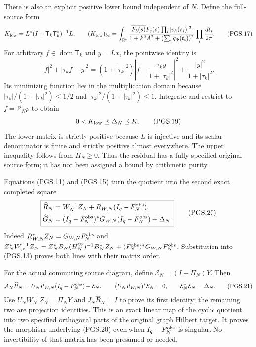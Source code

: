 There is also an explicit positive lower bound independent of \(N\).
Define the full-source form
\[
 K_{\rm low}=L^*(I+\mathsf T_k\mathsf T_k^*)^{-1}L,\qquad
 (K_{\rm low})_{bc}=\int_{\mathbb R^k}
   \frac{\overline{F_b(s)}F_c(s)
          \prod_i|v_h(s_i)|^2}
        {1+k^2A^2+(\sum_iq_\Phi(t_i))^2}
                  \prod_i\frac{dt_i}{2\pi}.
\tag{PGS.17}\label{eq:pgs-residual-bound}
\]
For arbitrary \(f\in\operatorname{dom}\mathsf T_k\) and \(y=Lx\),
the pointwise identity is
\[
 |f|^2+|\tau_k f-y|^2
  =(1+|\tau_k|^2)
       \left|f-\frac{\overline{\tau_k}y}{1+|\tau_k|^2}\right|^2
          +\frac{|y|^2}{1+|\tau_k|^2}.
\tag{PGS.18}\label{eq:pgs-pointwise-square}
\]
Its minimizing function lies in the multiplication domain because
\(|\tau_k|/(1+|\tau_k|^2)\le1/2\) and
\(|\tau_k|^2/(1+|\tau_k|^2)\le1\). Integrate and restrict to
\(f=\mathcal V_Np\) to obtain
\[
 0<K_{\rm low}\preceq\Delta_N\preceq K.
\tag{PGS.19}\label{eq:pgs-uniform-N}
\]
The lower matrix is strictly positive because \(L\) is injective
and its scalar denominator is finite and strictly positive almost
everywhere. The upper inequality follows from \(\Pi_N\ge0\).
Thus the residual has a fully specified original source form; it
has not been assigned a bound by arithmetic purity.

Equations (PGS.11) and (PGS.15) turn the quotient into the second
exact completed square
\[
\boxed{\begin{aligned}
 \widehat R_N&=W_N^{-1}Z_N+
                   R_{W,N}(I_q-F_N^{\rm obs}),\\
 \widehat G_N&=(I_q-F_N^{\rm obs})^*G_{W,N}
                   (I_q-F_N^{\rm obs})+\Delta_N.
\end{aligned}}
\tag{PGS.20}\label{eq:pgs-quotient-square}
\]
Indeed \(R_{W,N}^*Z_N=G_{W,N}F_N^{\rm obs}\) and
\(Z_N^*W_N^{-1}Z_N=Z_N^*B_N(H_N^W)^{-1}B_N^*Z_N
 +(F_N^{\rm obs})^*G_{W,N}F_N^{\rm obs}\).
Substitution into (PGS.13) proves both lines with their matrix order.

For the actual commuting source diagram, define
\(\mathcal E_N=(I-\Pi_N)Y\). Then
\[
 \mathcal A_N\widehat R_N
       =U_NR_{W,N}(I_q-F_N^{\rm obs})-\mathcal E_N,\qquad
 (U_NR_{W,N})^*\mathcal E_N=0,\qquad
 \mathcal E_N^*\mathcal E_N=\Delta_N.
\tag{PGS.21}\label{eq:pgs-orthogonal-source-map}
\]
Use \(U_NW_N^{-1}Z_N=\Pi_NY\) and \(J_N\widehat R_N=I\)
to prove its first identity; the remaining two are projection
identities. This is an exact linear map of the cyclic quotient into
two specified orthogonal parts of the original graph Hilbert target.
It proves the morphism underlying (PGS.20) even when
\(I_q-F_N^{\rm obs}\) is singular. No invertibility of that matrix
has been presumed or needed.

